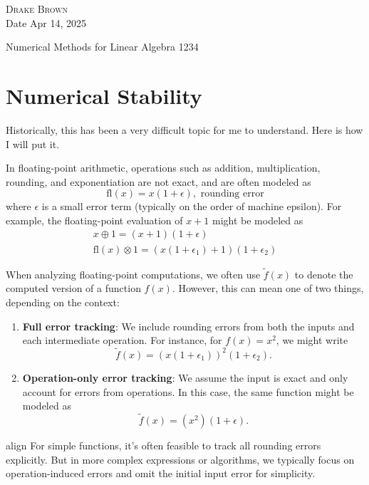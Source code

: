 \documentclass[12pt]{article}
\begin{document}
\DeclarePairedDelimiter\floor{\lfloor}{\rfloor}
\DeclarePairedDelimiter\ceil{\lceil}{\rceil}


\begin{flushright}
	\textsc{Drake Brown}  \\
	Date Apr 14, 2025
\end{flushright}
\begin{center}
	Numerical Methods for Linear Algebra 1234
\end{center}

\section{Numerical Stability}
Historically, this has been a very difficult topic for me to understand. Here is how I will put it.

In floating-point arithmetic, operations such as addition, multiplication, rounding, and exponentiation are not exact, and are often modeled as
\[
	\text{fl}(x) = x(1 + \epsilon),\text{ rounding error}
\]
where \(\epsilon\) is a small error term (typically on the order of machine epsilon). For example, the floating-point evaluation of \(x + 1\) might be modeled as
\begin{align*}
	x \oplus 1 = (x + 1)(1 + \epsilon) \\
	\text{fl}(x)\otimes 1 = (x(1+\epsilon_1)+1)(1+\epsilon_2)
\end{align*}

When analyzing floating-point computations, we often use \(\tilde{f}(x)\) to denote the computed version of a function \(f(x)\). However, this can mean one of two things, depending on the context:

\begin{enumerate}
	\item \textbf{Full error tracking}: We include rounding errors from both the inputs and each intermediate operation.
	      For instance, for \(f(x) = x^2\), we might write
	      \[
		      \tilde{f}(x) = \left(x(1 + \epsilon_1)\right)^2(1 + \epsilon_2).
	      \]

	\item \textbf{Operation-only error tracking}: We assume the input is exact and only account for errors from operations.
	      In this case, the same function might be modeled as
	      \[
		      \tilde{f}(x) = (x^2)(1 + \epsilon).
	      \]
\end{enumerate}
align
For simple functions, it's often feasible to track all rounding errors explicitly. But in more complex expressions or algorithms, we typically focus on operation-induced errors and omit the initial input error for simplicity.
\end{document}
